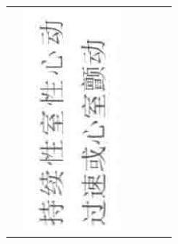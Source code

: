 \documentclass[10pt]{article}
\begin{document}
\begin{center}
\begin{tabular}{|c|c|c|c|c|c|}
 & \includegraphics[max width=\textwidth]{2024_07_05_645bb794a4d4f32ee0c8g-352(11)}

\end{tabular}
\end{center}
\end{document}
